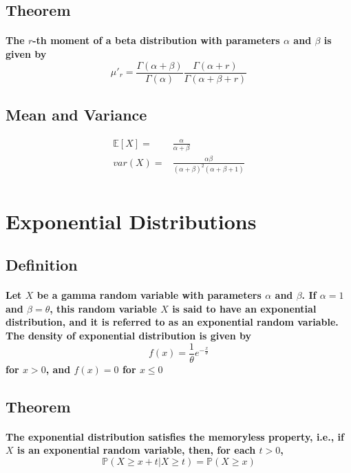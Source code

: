 \documentclass[titlepage]{article}
\begin{document}
        \subsection*{Theorem}
            \paragraph{
                The $r$-th moment of a beta distribution with parameters $\alpha$ and $\beta$ is given by 
                $$\mu'_r=\frac{\Gamma(\alpha+\beta)}{\Gamma(\alpha)}\frac{\Gamma(\alpha+r)}{\Gamma(\alpha+\beta
                +r)}$$
            }
        \subsection*{Mean and Variance}
            \begin{equation*}
                \begin{split}
                    \mathbb{E}[X]=&\frac{\alpha}{\alpha+\beta}\\
                    var(X)=&\frac{\alpha\beta}{(\alpha+\beta)^2(\alpha+\beta+1)}\\
                \end{split}
            \end{equation*}
    \section{Exponential Distributions}
        \subsection*{Definition}
            \paragraph{
                Let $X$ be a gamma random variable with parameters $\alpha$ and $\beta$. If $\alpha=1$ and $\beta=\theta$, this random variable $X$ is said to have an exponential distribution, and it is referred to as an exponential random variable. The density of exponential distribution is given by 
                $$f(x)=\frac{1}{\theta}e^{-\frac{x}{\theta}}$$
                for $x>0$, and $f(x)=0$ for $x\leq 0$
            }
        \subsection*{Theorem}
            \paragraph{
                The exponential distribution satisfies the memoryless property, i.e., if $X$ is an exponential random variable, then, for each $t>0$,
                $$\mathbb{P}(X\geq x+t|X\geq t)=\mathbb{P}(X\geq x)$$
            }
\end{document}
